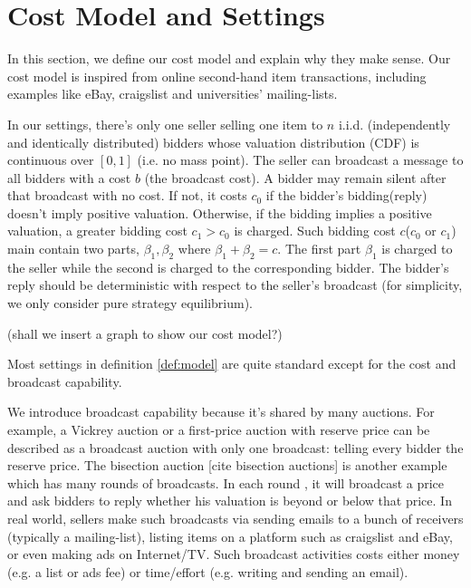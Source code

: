 \section{Cost Model and Settings}

In this section, we define our cost model and explain why they make sense. Our
cost model is inspired from online second-hand item transactions, including
examples like eBay, craigslist and universities' mailing-lists.


\begin{definition}\label{def:model}

In our settings, there's only one seller selling one item to $n$ i.i.d.
(independently and identically distributed) bidders whose valuation distribution
(CDF) is continuous over $[0, 1]$ (i.e. no mass point).  The seller can
broadcast a message to all bidders with a cost $b$ (the broadcast cost). A
bidder may remain silent after that broadcast with no cost.  If not, it costs
$c_0$ if the bidder's bidding(reply) doesn't imply positive valuation.
Otherwise, if the bidding implies a positive valuation, a greater bidding cost
$c_1 > c_0$ is charged.  Such bidding cost $c$($c_0$ or $c_1$) main contain two
parts, $\beta_1, \beta_2$ where $\beta_1+\beta_2 = c$.  The first part
$\beta_1$ is charged to the seller while the second is charged to the
corresponding bidder. The bidder's reply should be deterministic with respect
to the seller's broadcast (for simplicity, we only consider pure strategy
equilibrium).

\end{definition}

(shall we insert a graph to show our cost model?)

Most settings in definition \ref{def:model} are quite standard except for the
cost and broadcast capability.

We introduce broadcast capability because it's shared by many auctions.  For
example, a Vickrey auction or a first-price auction with reserve price can be
described as a broadcast auction with only one broadcast: telling every bidder
the reserve price. The bisection auction [cite bisection auctions] is another
example which has many rounds of broadcasts. In each round , it will broadcast
a price and ask bidders to reply whether his valuation is beyond or below that
price.  In real world, sellers make such broadcasts via sending emails to a
bunch of receivers (typically a mailing-list), listing items on a platform such
as craigslist and eBay, or even making ads on Internet/TV. Such broadcast
activities costs either money (e.g. a list or ads fee) or time/effort (e.g.
writing and sending an email).

